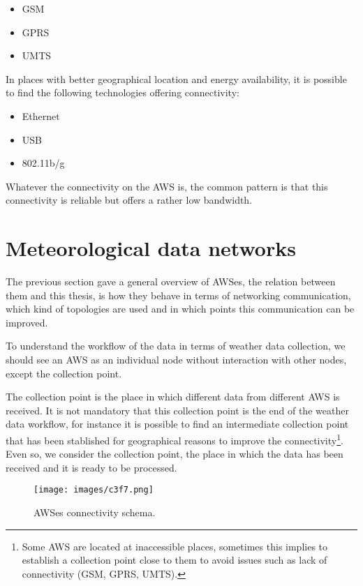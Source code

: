 {\begin{itemize}
\item \gls{GSM}
\item \gls{GPRS}
\item \gls{UMTS}
\end{itemize}

In places with better geographical location and energy availability, it is possible to find the following technologies offering connectivity:

\begin{itemize}
\item Ethernet
\item \gls{USB}
\item 802.11b/g
\end{itemize}

Whatever the connectivity on the \gls{AWS} is, the common pattern is that this connectivity is reliable but offers a rather low bandwidth. 

\section{Meteorological data networks}

The previous section gave a general overview of \gls{AWS}es, the relation between them and this thesis, is how they behave in terms of networking communication, which kind of topologies are used and in which points this communication can be improved.

To understand the workflow of the data in terms of weather data collection, we should see an \gls{AWS} as an individual node without interaction with other nodes, except the collection point.

The collection point is the place in which different data from different \gls{AWS} is received. It is not mandatory that this collection point is the end of the weather data workflow, for instance it is possible to find an intermediate collection point that has been stablished for geographical reasons to improve the connectivity\footnote{Some \gls{AWS} are located at inaccessible places, sometimes this implies to establish a collection point close to them to avoid issues such as lack of connectivity (\gls{GSM}, \gls{GPRS}, \gls{UMTS}).}. Even so, we consider the collection point, the place in which the data has been received and it is ready to be processed.

\begin{figure}[H]
\centerline{\texttt{[image: images/c3f7.png]}}
\caption{\protect \gls{AWS}es connectivity schema.}
\end{figure}

}
